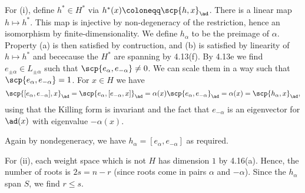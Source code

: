 For (i), define $h^* \in H^*$ via $h^*(x)\coloneqq \scp{h, x}_{\ad}$.
There is a linear map $h\mapsto h^*$. This map is injective by
non-degeneracy of the restriction, hence an isomorphism by finite-dimensionality.
We define  $h_\alpha$ to be the preimage of $\alpha$. Property (a) is then
satisfied by contruction, and (b) is satisfied by linearity of $h\mapsto h^*$ and
bececause the $H^*$ are spanning by 4.13(f). By 4.13e we find
$e_{\pm\alpha} \in L_{\pm\alpha}$ such that $\scp{e_\alpha, e_{-\alpha}}\neq 0$.
We can scale them in a way such that $\scp{e_\alpha, e_{-\alpha}} = 1$.
For $x \in H$ we have
\[ \scp{[e_\alpha, e_{-\alpha}], x}_{\ad} = \scp{e_\alpha, [e_{-\alpha}, x]}_{\ad}
= \alpha(x)\scp{e_\alpha, e_{-\alpha}}_{\ad} = \alpha(x) = \scp{h_\alpha, x}_{\ad}, \]
using that the Killing form is invariant and the fact that $e_{-\alpha}$ is an
eigenvector for $\ad(x)$ with eigenvalue $-\alpha(x)$.

Again by nondegeneracy, we have $h_\alpha = [e_\alpha, e_{-\alpha}]$ as required.

For (ii), each weight space which is not $H$ has dimension $1$ by 4.16(a). Hence,
the number of roots is $2s = n - r$ (since roots come in pairs  $\alpha$ and $-\alpha$).
Since the $h_\alpha$ span $S$, we find $r\leq s$.
